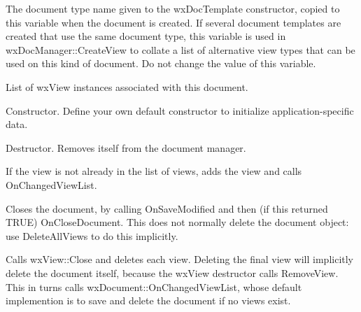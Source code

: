 
The document type name given to the wxDocTemplate constructor, copied to this
variable when the document is created. If several document templates are
created that use the same document type, this variable is used in wxDocManager::CreateView
to collate a list of alternative view types that can be used on this kind of
document. Do not change the value of this variable.



List of wxView instances associated with this document.



Constructor. Define your own default constructor to initialize application-specific
data.



Destructor. Removes itself from the document manager.



If the view is not already in the list of views, adds the view and calls OnChangedViewList.



Closes the document, by calling OnSaveModified and then (if this returned TRUE) OnCloseDocument.
This does not normally delete the document object: use DeleteAllViews to do this implicitly.



Calls wxView::Close and deletes each view. Deleting the final view will implicitly
delete the document itself, because the wxView destructor calls RemoveView. This
in turns calls wxDocument::OnChangedViewList, whose default implemention is to
save and delete the document if no views exist.



